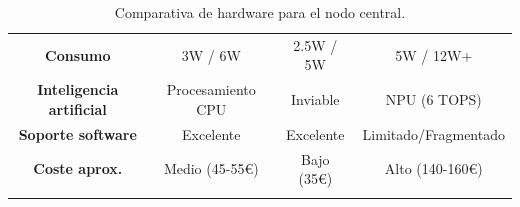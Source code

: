 \begin{table}[H]
\begin{tabular}{|c|c|c|c|}
        \parbox[c]{4.6cm}{\vspace{0.2cm}\centering\textbf{Consumo}\vspace{0.2cm}} & \parbox[c]{2.9cm}{\vspace{0.2cm}\centering 3W / 6W\vspace{0.2cm}} & \parbox[c]{2.9cm}{\vspace{0.2cm}\centering 2.5W / 5W\vspace{0.2cm}} & \parbox[c]{2.9cm}{\vspace{0.2cm}\centering 5W / 12W+\vspace{0.2cm}} \\ \hhline{|-|-|-|-|}
        \parbox[c]{4.6cm}{\vspace{0.2cm}\centering\textbf{Inteligencia artificial}\vspace{0.2cm}} & \parbox[c]{2.9cm}{\vspace{0.2cm}\centering Procesamiento CPU\vspace{0.2cm}} & \parbox[c]{2.9cm}{\vspace{0.2cm}\centering Inviable\vspace{0.2cm}} & \parbox[c]{2.9cm}{\vspace{0.2cm}\centering NPU (6 TOPS)\vspace{0.2cm}} \\ \hhline{|-|-|-|-|}
        \parbox[c]{4.6cm}{\vspace{0.2cm}\centering\textbf{Soporte software}\vspace{0.2cm}} & \parbox[c]{2.9cm}{\vspace{0.2cm}\centering Excelente\vspace{0.2cm}} & \parbox[c]{2.9cm}{\vspace{0.2cm}\centering Excelente\vspace{0.2cm}} & \parbox[c]{2.9cm}{\vspace{0.2cm}\centering Limitado/\allowbreak Fragmentado\vspace{0.2cm}} \\ \hhline{|-|-|-|-|}
        \parbox[c]{4.6cm}{\vspace{0.2cm}\centering\textbf{Coste aprox.}\vspace{0.2cm}} & \parbox[c]{2.9cm}{\vspace{0.2cm}\centering Medio (45-55€)\vspace{0.2cm}} & \parbox[c]{2.9cm}{\vspace{0.2cm}\centering Bajo (35€)\vspace{0.2cm}} & \parbox[c]{2.9cm}{\vspace{0.2cm}\centering Alto (140-160€)\vspace{0.2cm}} \\ \hhline{|-|-|-|-|}
    \end{tabular}
    \caption{Comparativa de hardware para el nodo central.}
    \label{tab:hw_central}
\end{table}

